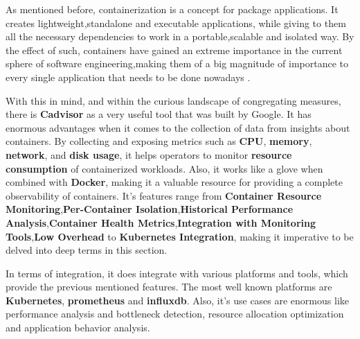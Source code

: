As mentioned before, containerization is a concept for package applications. It creates lightweight,standalone  and executable applications, while giving to them all the necessary dependencies to work in a portable,scalable and isolated way. By the effect of such, containers have gained an extreme importance in the current sphere of software engineering,making them of a big magnitude of importance to every single application that needs to be done nowadays \cite{cadvisor}.

With this in mind, and within the curious landscape of congregating measures, there is \textbf{Cadvisor} as a very useful tool that was built by Google. It has enormous advantages when it comes to the collection of data from insights about containers. By collecting and exposing metrics such as \textbf{CPU}, \textbf{memory}, \textbf{network}, and \textbf{disk usage}, it helps operators to monitor \textbf{resource consumption} of containerized workloads. Also, it works like a glove when combined with \textbf{Docker}, making it a valuable resource for providing a complete observability of containers. It's features range from \textbf{Container Resource Monitoring},\textbf{Per-Container Isolation},\textbf{Historical Performance Analysis},\textbf{Container Health Metrics},\textbf{Integration with Monitoring Tools},\textbf{Low Overhead} to \textbf{Kubernetes Integration}, making it imperative to be delved into deep terms in this section.

In terms of integration, it does integrate with various platforms and tools, which provide the previous mentioned features. The most well known platforms are \textbf{Kubernetes}, \textbf{prometheus} and \textbf{influxdb}. Also, it's use cases are enormous like performance analysis and bottleneck detection, resource allocation optimization and application behavior analysis.

